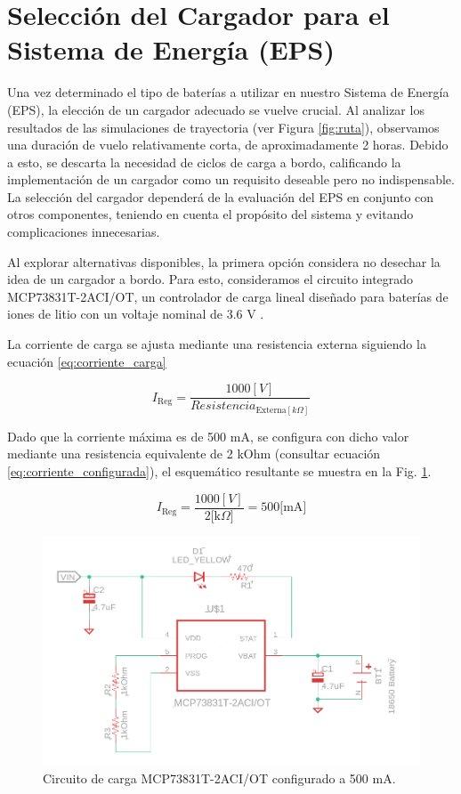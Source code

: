 \section{Selección del Cargador para el Sistema de Energía (EPS)}

Una vez determinado el tipo de baterías a utilizar en nuestro Sistema de Energía (EPS), la elección de un cargador adecuado se vuelve crucial. Al analizar los resultados de las simulaciones de trayectoria (ver Figura \ref{fig:ruta}), observamos una duración de vuelo relativamente corta, de aproximadamente 2 horas. Debido a esto, se descarta la necesidad de ciclos de carga a bordo, calificando la implementación de un cargador como un requisito deseable pero no indispensable. La selección del cargador dependerá de la evaluación del EPS en conjunto con otros componentes, teniendo en cuenta el propósito del sistema y evitando complicaciones innecesarias.

Al explorar alternativas disponibles, la primera opción considera no desechar la idea de un cargador a bordo. Para esto, consideramos el circuito integrado MCP73831T-2ACI/OT, un controlador de carga lineal diseñado para baterías de iones de litio con un voltaje nominal de 3.6 V \cite{MCP73831-datasheet,sparkfun-10217}.

La corriente de carga se ajusta mediante una resistencia externa siguiendo la ecuación \ref{eq:corriente_carga}

\begin{equation}\label{eq:corriente_carga}
    I_{\text{Reg}} = \frac{1000[V]}{Resistencia_{\text{Externa}[k\Omega]}}
\end{equation}

Dado que la corriente máxima es de 500 mA, se configura con dicho valor mediante una resistencia equivalente de 2 kOhm (consultar ecuación \ref{eq:corriente_configurada}), el esquemático resultante se muestra en la Fig. \ref{fig:cargador}.

\begin{equation}\label{eq:corriente_configurada}
    I_{\text{Reg}} = \frac{1000[V]}{2 \text{[k}\Omega\text{]}} = 500 \text{[mA]}
\end{equation}

\begin{figure}[h]
  \centering
  \includegraphics[width=0.75\linewidth]{Pictures/Circuito_cargador.png} 
  \caption{Circuito de carga MCP73831T-2ACI/OT configurado a 500 mA. }
  \label{fig:cargador}
\end{figure}

